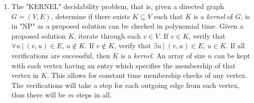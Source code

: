 \documentclass{article}
\begin{document}
\begin{enumerate}
% 
% 
% 
% 
% 



\item The "KERNEL" decidability problem, that is, given a directed graph $G=(V,E)$, determine if there exists $K \subseteq V$ such that $K$ is a \emph{kernel} of $G$, is in "NP" as a proposed solution can be checked in polynomial time.  Given a proposed solution $K$, iterate through each $v \in V$.  If $v \in K$, verify that $\forall u~|~(v,u) \in E$, $u \notin K$.  If $v \notin K$, verify that $\exists u~|~(v,u) \in E$, $u \in K$.  If all verifications are successful, then $K$ is a \emph{kernel}. An array of size $n$ can be kept with each vertex having an entry which specifies the membership of that vertex in $K$. This allows for constant time membership checks of any vertex. The verifications will take a step for each outgoing edge from each vertex, thus there will be $m$ steps in all.


\end{enumerate}
\end{document}
